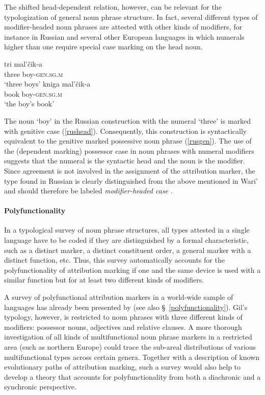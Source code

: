 The shifted head-dependent relation, however, can be relevant for the typologization of general noun phrase structure. In fact, several different types of modifier\hyp{}headed noun phrases are attested with other kinds of modifiers, for instance in Russian and several other European languages in which numerals higher than one require special case marking on the head noun.
\begin{exe}
\ex \label{russianheadstand} 
\begin{xlist}
\ex \label{rushead}
\gll tri mal'čik-a\\
  	three		boy-\textsc{gen.sg.m}\\
  \glt ‘three boys’
\ex \label{rusgen}
  \gll	kniga mal'čik-a\\
  	book	 boy-\textsc{gen.sg.m}\\
  \trans ‘the boy's book’
\end{xlist}
\end{exe}
The noun ‘boy’ in the Russian construction with the numeral ‘three’ is marked with genitive case (\ref{rushead}). Consequently, this construction is syntactically equivalent to the genitive marked possessive noun phrase (\ref{rusgen}). The use of the (dependent marking) possessor case in noun phrases with numeral modifiers suggests that the numeral is the syntactic head and the noun is the modifier. Since agreement is not involved in the assignment of the attribution marker, the type found in Russian is clearly distinguished from the above mentioned  in Wari' and should therefore be labeled \textit{modifier\hyp{}headed case} \citep[cf.][]{AUTOTYP-NP}.

\paragraph*{Polyfunctionality} 
In a typological survey of noun phrase structures, all types attested in a single language have to be coded if they are distinguished by a formal characteristic, such as a distinct marker, a distinct constituent order, a general marker with a distinct function, etc. Thus, this survey automatically accounts for the polyfunctionality of attribution marking if one and the same device is used with a similar function but for at least two different kinds of modifiers.

A survey of polyfunctional attribution markers in a world-wide sample of languages has already been presented by \citet{gil2005} (see also \S~\ref{polyfunctionality}). Gil's typology, however, is restricted to noun phrases with three different kinds of modifiers: possessor nouns, adjectives and relative clauses. A more thorough investigation of all kinds of multifunctional noun phrase markers in a restricted area (such as northern Europe) could trace the sub-areal distributions of various multifunctional types across certain genera. Together with a description of known evolutionary paths of attribution marking, such a survey would also help to develop a theory that accounts for polyfunctionality from both a diachronic and a synchronic perspective.
